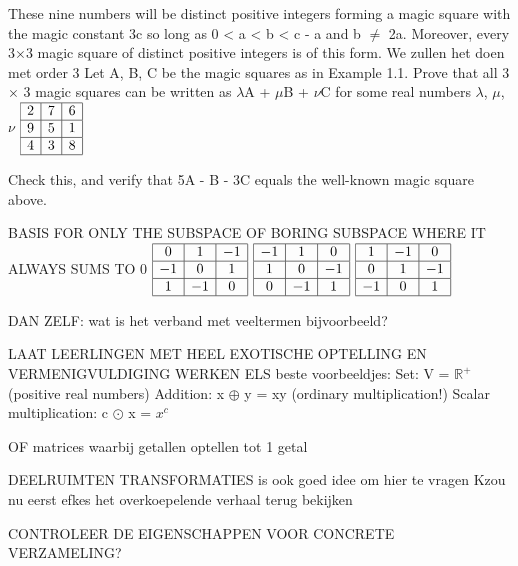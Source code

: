 \documentclass{ximera}
\begin{document}
These nine numbers will be distinct positive integers forming a magic square with the magic constant 3c so long as 0 < a < b < c - a and b $\neq$ 2a. Moreover, every 3$\times$3 magic square of distinct positive integers is of this form. 
We zullen het doen met order 3
Let A, B, C be the magic squares as in Example 1.1. Prove that all 3 $\times$ 3
magic squares can be written as $\lambda$A + $\mu$B + $\nu$C for some real numbers $\lambda$, $\mu$, $\nu$
\(
\begin{array}{|c|c|c|}
\hline
2 & 7 & 6 \\
\hline
9 & 5 & 1 \\
\hline
4 & 3 & 8 \\
\hline
\end{array}
\)

Check this, and verify that 5A - B - 3C equals the well-known magic square above.

BASIS FOR ONLY THE SUBSPACE OF BORING SUBSPACE WHERE IT ALWAYS SUMS TO
0
\(
\begin{array}{|c|c|c|}
\hline
0 & 1 & -1 \\
\hline
-1 & 0 & 1 \\
\hline
1 & -1 & 0 \\
\hline
\end{array}
\)
\(
\begin{array}{|c|c|c|}
\hline
-1 & 1 & 0 \\
\hline
1 & 0 & -1 \\
\hline
0 & -1 & 1 \\
\hline
\end{array}
\)
\(
\begin{array}{|c|c|c|}
\hline
1 & -1 & 0 \\
\hline
0 & 1 & -1 \\
\hline
-1 & 0 & 1 \\
\hline
\end{array}
\)

DAN ZELF: wat is het verband met veeltermen bijvoorbeeld?

LAAT LEERLINGEN MET HEEL EXOTISCHE OPTELLING EN VERMENIGVULDIGING WERKEN
ELS beste voorbeeldjes:
Set: V = $\mathbb{R}^{+}$ (positive real numbers)
Addition: x $\oplus$ y = xy (ordinary multiplication!)
Scalar multiplication: c $\odot$ x = $x^c$

OF matrices waarbij getallen optellen tot 1 getal

DEELRUIMTEN TRANSFORMATIES is ook goed idee om hier te vragen
Kzou nu eerst efkes het overkoepelende verhaal terug bekijken


CONTROLEER DE EIGENSCHAPPEN VOOR CONCRETE VERZAMELING?
\end{document}
